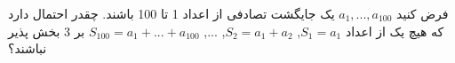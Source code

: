 فرض کنید 
$a_1, ..., a_{100}$
یک جایگشت تصادفی از اعداد 1 تا 100 باشند. چقدر احتمال دارد که هیچ یک از اعداد
$S_1 = a_1$, $S_2 = a_1 + a_2$, ..., $S_{100} = a_1 + ... + a_{100}$
بر 3 بخش پذیر نباشند؟

\\
